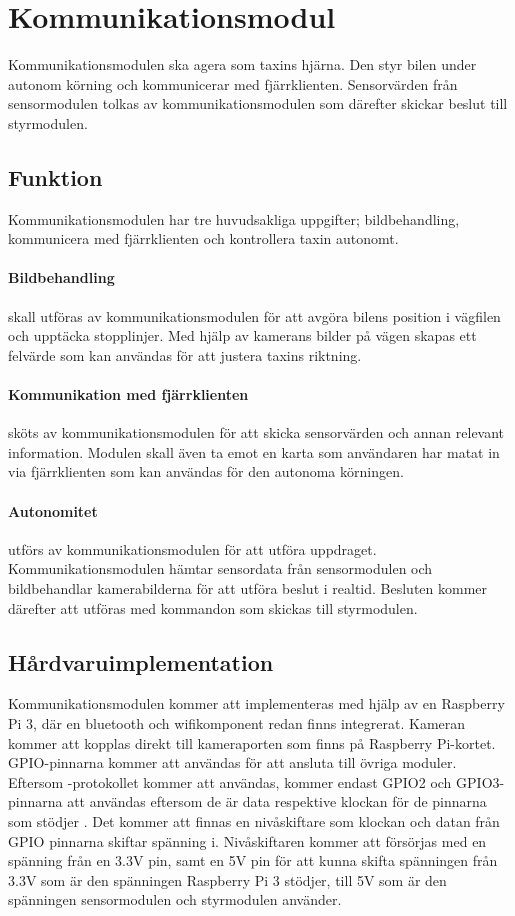\documentclass[designspec/spec.tex]{subfiles}
\begin{document}
\section{Kommunikationsmodul}
Kommunikationsmodulen ska agera som taxins hjärna. Den styr bilen under autonom
körning och kommunicerar med fjärrklienten. Sensorvärden från sensormodulen
tolkas av kommunikationsmodulen som därefter skickar beslut till styrmodulen.

\subsection{Funktion}
Kommunikationsmodulen har tre huvudsakliga uppgifter; bildbehandling,
kommunicera med fjärrklienten och kontrollera taxin autonomt.

\paragraph{Bildbehandling} skall utföras av kommunikationsmodulen för att
avgöra bilens position i vägfilen och upptäcka stopplinjer. Med hjälp av
kamerans bilder på vägen skapas ett felvärde som kan användas för att justera
taxins riktning.

\paragraph{Kommunikation med fjärrklienten} sköts av kommunikationsmodulen för
att skicka sensorvärden och annan relevant information. Modulen skall även ta
emot en karta som användaren har matat in via fjärrklienten som kan användas 
för den autonoma körningen.

\paragraph{Autonomitet} utförs av kommunikationsmodulen för att utföra
uppdraget. Kommunikationsmodulen hämtar sensordata från sensormodulen och
bildbehandlar kamerabilderna för att utföra beslut i realtid. Besluten kommer
därefter att utföras med kommandon som skickas till styrmodulen.

\subsection{Hårdvaruimplementation} 
Kommunikationsmodulen kommer att implementeras med hjälp av en Raspberry Pi 3,
där en bluetooth och wifikomponent redan finns integrerat. Kameran kommer att
kopplas direkt till kameraporten som finns på Raspberry Pi-kortet.
GPIO-pinnarna  kommer att användas för att ansluta till övriga moduler.
Eftersom {\iic}-protokollet kommer att användas, kommer endast GPIO2 och
GPIO3-pinnarna att användas eftersom de är data respektive klockan för de
pinnarna som stödjer {\iic}. Det kommer att finnas en nivåskiftare som klockan
och datan från GPIO pinnarna skiftar spänning i. Nivåskiftaren kommer att
försörjas med en spänning från en 3.3V pin, samt en 5V pin för att kunna skifta
spänningen från 3.3V som är den spänningen Raspberry Pi 3 stödjer, till 5V som
är den spänningen sensormodulen och styrmodulen använder.
\end{document}
